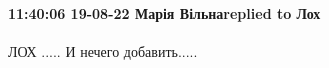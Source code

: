  
 
 
 
 

\paragraph{11:40:06 19-08-22 Марія Вільнаreplied to Лох}

ЛОХ .....
И нечего добавить.....
